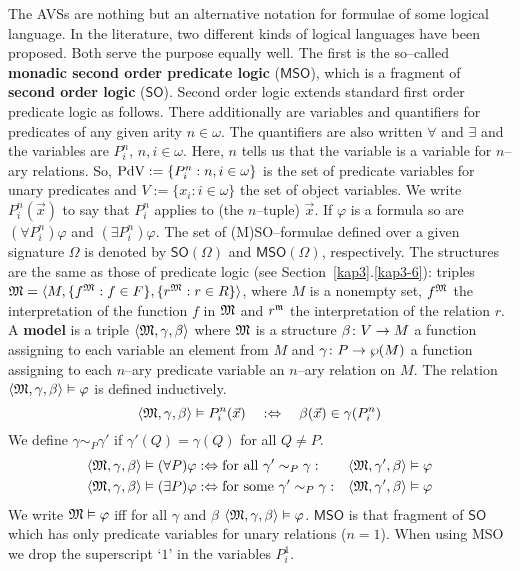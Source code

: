 The AVSs are nothing but an alternative notation for formulae 
of some logical language. In the literature, two different kinds 
of logical languages have been proposed. Both serve the purpose 
equally well. The first is the so--called \textbf{monadic second order 
predicate logic} ($\mathsf{MSO}$), which is a fragment of \textbf{second 
order logic} ($\mathsf{SO}$). Second order logic extends standard first 
order predicate logic as follows. There additionally are variables 
and quantifiers for predicates of any given arity $n \in \omega$. 
The quantifiers are also written $\forall$ and $\exists$ and the 
variables are $P^n_i$, $n, i \in \omega$. Here, $n$ tells us that 
the variable is a variable for $n$--ary relations. So, 
$\mbox{\rm PdV} := \{P^n_i : n, i \in \omega\}$ is the set of 
predicate variables 
for unary predicates and $V := \{x_i : i \in \omega\}$ the set of 
object variables. We write $P^n_i(\vec{x})$ to say that $P^n_i$ applies 
to (the $n$--tuple) $\vec{x}$. If $\varphi$ is a formula so are 
$(\forall P^n_i)\varphi$ and $(\exists P^n_i)\varphi$. The set of 
(M)SO--formulae defined over a given signature $\Omega$ is 
denoted by $\mathsf{SO}(\Omega)$ and $\mathsf{MSO}(\Omega)$, respectively. 
The structures are the same as
those of predicate logic (see Section~\ref{kap3}.\ref{kap3-6}): 
triples $\GM = \auf M, \{f^{\GM} : f \in F\}, %
\{r^{\GM} : r \in R\}\zu$, where $M$ is a nonempty set,
$f^{\mathfrak{M}}$ the interpretation of the function $f$ in $\mathfrak{M}$ and
$r^{\mathfrak{m}}$ the interpretation of the relation $r$. A \textbf{model}
is a triple $\langle \mathfrak{M}, \gamma, \beta\rangle$ where $\mathfrak{M}$ is a structure
$\beta \colon V \rightarrow M$ a function assigning to each variable an
element from $M$ and $\gamma \colon P \rightarrow \wp(M)$ a function assigning
to each $n$--ary predicate variable an $n$--ary relation on
$M$. The relation $\langle \mathfrak{M}, \gamma, \beta\rangle \vDash \varphi$ is
defined inductively.
\begin{equation}
\langle \mathfrak{M}, \gamma, \beta\rangle \vDash P^n_i(\vec{x})
\quad:\Leftrightarrow\quad
\beta(\vec{x}) \in \gamma(P^n_i)
\end{equation}
We define $\gamma \sim_P \gamma'$ if $\gamma'(Q) = \gamma(Q)$
for all $Q \neq P$.
\begin{align}
\langle \mathfrak{M}, \gamma, \beta\rangle \vDash (\forall P)\varphi &
    :\Leftrightarrow \text{for all }\gamma' \sim_P \gamma : &&
    \langle \mathfrak{M}, \gamma', \beta\rangle \vDash \varphi \\
\langle \mathfrak{M}, \gamma, \beta\rangle \vDash (\exists P)\varphi &
    :\Leftrightarrow \text{for some }\gamma' \sim_P \gamma : &&
    \langle \mathfrak{M}, \gamma', \beta\rangle \vDash \varphi
\end{align}
We write $\mathfrak{M} \vDash \varphi$ iff for all $\gamma$ and $\beta$
$\langle \mathfrak{M}, \gamma, \beta\rangle \vDash \varphi$. $\mathsf{MSO}$ is that
fragment of $\mathsf{SO}$ which has only predicate variables for 
unary relations ($n = 1$). When using MSO we drop the superscript 
`$1$' in the variables $P^1_i$.

